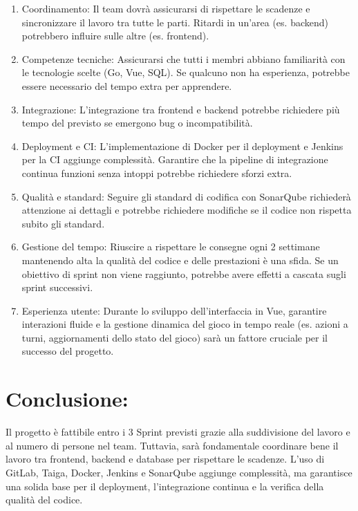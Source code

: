 \documentclass{article}
\begin{document}
\begin{enumerate}
    \item Coordinamento: Il team dovrà assicurarsi di rispettare le scadenze e sincronizzare il lavoro tra tutte le parti. Ritardi in un'area (es. backend) potrebbero influire sulle altre (es. frontend).
   \item Competenze tecniche: Assicurarsi che tutti i membri abbiano familiarità con le tecnologie scelte (Go, Vue, SQL). Se qualcuno non ha esperienza, potrebbe essere necessario del tempo extra per apprendere.
   \item Integrazione: L'integrazione tra frontend e backend potrebbe richiedere più tempo del previsto se emergono bug o incompatibilità.
   \item Deployment e CI: L'implementazione di Docker per il deployment e Jenkins per la CI aggiunge complessità. Garantire che la pipeline di integrazione continua funzioni senza intoppi potrebbe richiedere sforzi extra.
   \item Qualità e standard: Seguire gli standard di codifica con SonarQube richiederà attenzione ai dettagli e potrebbe richiedere modifiche se il codice non rispetta subito gli standard.
   \item Gestione del tempo: Riuscire a rispettare le consegne ogni 2 settimane mantenendo alta la qualità del codice e delle prestazioni è una sfida. Se un obiettivo di sprint non viene raggiunto, potrebbe avere effetti a cascata sugli sprint successivi.
   \item Esperienza utente: Durante lo sviluppo dell'interfaccia in Vue, garantire interazioni fluide e la gestione dinamica del gioco in tempo reale (es. azioni a turni, aggiornamenti dello stato del gioco) sarà un fattore cruciale per il successo del progetto.
\end{enumerate}

\section{Conclusione:}
    Il progetto è fattibile entro i 3 Sprint previsti grazie alla suddivisione del lavoro e al numero di persone nel team. Tuttavia, sarà fondamentale coordinare bene il lavoro tra frontend, backend e database per rispettare le scadenze. 
   L'uso di GitLab, Taiga, Docker, Jenkins e SonarQube aggiunge complessità, ma garantisce una solida base per il deployment, l'integrazione continua e la verifica della qualità del codice.
\end{document}
